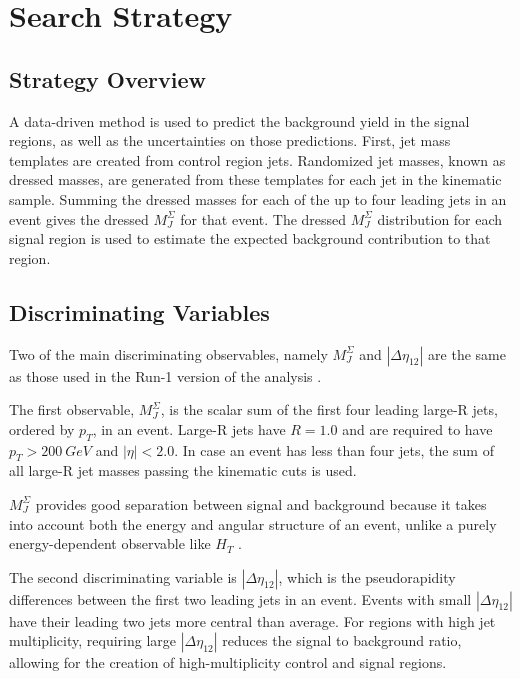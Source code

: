 \chapter{Search Strategy} \label{chapter-method}

\section{Strategy Overview}
A data-driven method is used to predict the background yield in the
signal regions, as well as the uncertainties on those
predictions. First, jet mass templates are created from control region jets.
Randomized jet masses, known as dressed masses, are generated from
these templates for each jet in the kinematic sample. Summing the
dressed masses for each of the up to four leading jets in an event gives the
dressed $M_{J}^{\Sigma}$ for that event. The dressed $M_{J}^{\Sigma}$
distribution for each signal region is
used to estimate the expected background contribution to that region.

\section{Discriminating Variables}
Two of the main discriminating observables, namely $M_J^{\Sigma}$ and
$|\Delta\eta_{12}|$ are the same as those used in the Run-1 version of
the analysis \cite{run1-multijet}. 

The first observable,
$M_J^{\Sigma}$, is the scalar sum of the first four leading large-R jets,
ordered by $p_{T}$, in an event. Large-R jets have $R=1.0$ and are
required to have $p_{T} > 200~GeV$ and $|\eta|<2.0$. In case an event has less than four
jets, the sum of all large-R jet masses passing the kinematic cuts is
used.

$M_{J}^{\Sigma}$ provides good separation between signal and
background because it takes into
account both the energy and angular structure of an event, unlike a
purely energy-dependent observable like $H_{T}$ \cite{hook-mj,
  elhedri-mj}.

The second discriminating variable is $|\Delta \eta_{12}|$, which is
the pseudorapidity differences between the first two leading jets in
an event. Events with small $|\Delta \eta_{12}|$ have their leading
two jets more central than average. For regions with high jet
multiplicity, requiring large $|\Delta \eta_{12}|$ reduces the signal
to background ratio, allowing for the creation of high-multiplicity
control and signal regions.

